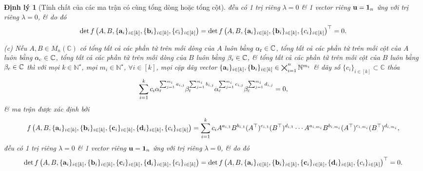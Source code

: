 \documentclass{article}
\newtheorem{dinhly}{Định lý}
\begin{document}
\begin{dinhly}[Tính chất của các ma trận có cùng tổng dòng hoặc tổng cột]
	đều có 1 trị riêng $\lambda = 0$ \& 1 vector riêng ${\bf u} = {\bf1}_n$ ứng với trị riêng $\lambda = 0$, \& do đó
	\begin{equation*}
		\det f\left(A,B,\{{\bf a}_i\}_{i\in[k]},\{{\bf b}_i\}_{i\in[k]},\{c_i\}_{i\in[k]}\right) = \det f\left(A,B,\{{\bf a}_i\}_{i\in[k]},\{{\bf b}_i\}_{i\in[k]},\{c_i\}_{i\in[k]}\right)^\top = 0.
	\end{equation*}
	\item(c) Nếu $A,B\in M_n(\mathbb{C})$ có tổng tất cả các phần tử trên mỗi dòng của $A$ luôn bằng $\alpha_{\rm r}\in\mathbb{C}$, tổng tất cả các phần tử trên mỗi cột của $A$ luôn bằng $\alpha_{\rm c}\in\mathbb{C}$, tổng tất cả các phần tử trên mỗi dòng của $B$ luôn bằng $\beta_{\rm r}\in\mathbb{C}$, \& tổng tất cả các phần tử trên mỗi cột của $B$ luôn bằng $\beta_{\rm c}\in\mathbb{C}$ thì với mọi $k\in\mathbb{N}^\star$, mọi $m_i\in\mathbb{N}^\star$, $\forall i\in[k]$, mọi cặp dãy vector $\{{\bf a}_i\}_{i\in[k]},\{{\bf b}_i\}_{i\in[k]}\in\bigtimes_{i=1}^n \mathbb{N}^{m_i}$ \& dãy số $\{c_i\}_{i\in[k]}\subset\mathbb{C}$ thỏa
	\begin{equation*}
		\sum_{i=1}^k c_i\alpha_{\rm r}^{\sum_{j=1}^{m_i} a_{i,j}}\beta_{\rm r}^{\sum_{j=1}^{m_i} b_{i,j}}\alpha_{\rm c}^{\sum_{j=1}^{m_i} c_{i,j}}\beta_{\rm c}^{\sum_{j=1}^{m_i} d_{i,j}} = 0,
	\end{equation*}
	\& ma trận được xác định bởi
	\begin{equation*}
		f\left(A,B,\{{\bf a}_i\}_{i\in[k]},\{{\bf b}_i\}_{i\in[k]},\{{\bf c}_i\}_{i\in[k]},\{{\bf d}_i\}_{i\in[k]},\{c_i\}_{i\in[k]}\right) = \sum_{i=1}^k c_iA^{a_{i,1}}B^{b_{i,1}}(A^\top)^{c_{i,1}}(B^\top)^{d_{i,1}}\cdots A^{a_{i,m_i}}B^{b_{i,m_i}}(A^\top)^{c_{i,m_i}}(B^\top)^{d_{i,m_i}},
	\end{equation*}
	đều có 1 trị riêng $\lambda = 0$ \& 1 vector riêng ${\bf u} = {\bf1}_n$ ứng với trị riêng $\lambda = 0$, \& do đó
	\begin{equation*}
		\det f\left(A,B,\{{\bf a}_i\}_{i\in[k]},\{{\bf b}_i\}_{i\in[k]},\{{\bf c}_i\}_{i\in[k]},\{{\bf d}_i\}_{i\in[k]},\{c_i\}_{i\in[k]}\right) = \det f\left(A,B,\{{\bf a}_i\}_{i\in[k]},\{{\bf b}_i\}_{i\in[k]},\{{\bf c}_i\}_{i\in[k]},\{{\bf d}_i\}_{i\in[k]},\{c_i\}_{i\in[k]}\right)^\top = 0.
	\end{equation*}
\end{dinhly}
\end{document}
